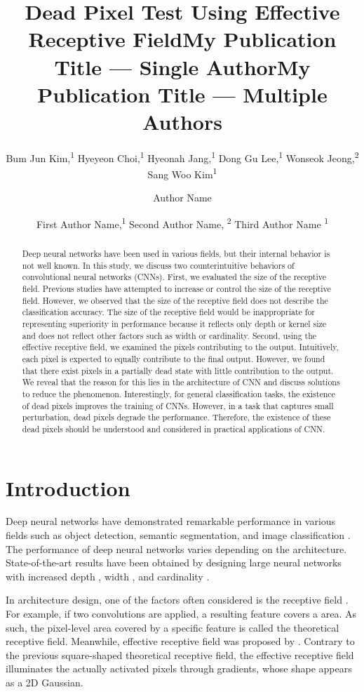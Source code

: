 \documentclass[letterpaper]{article} \usepackage{aaai22}  \usepackage{times}  \usepackage{helvet}  \usepackage{courier}  \usepackage[hyphens]{url}  \usepackage{graphicx} \urlstyle{rm} \def\UrlFont{\rm}  \usepackage{natbib}  \usepackage{caption} \DeclareCaptionStyle{ruled}{labelfont=normalfont,labelsep=colon,strut=off} \frenchspacing  \setlength{\pdfpagewidth}{8.5in}  \setlength{\pdfpageheight}{11in}  \usepackage{algorithm}
\title{Dead Pixel Test Using Effective Receptive Field}
\author{
Bum Jun Kim,\textsuperscript{\rm 1}
    Hyeyeon Choi,\textsuperscript{\rm 1}
    Hyeonah Jang,\textsuperscript{\rm 1}
    Dong Gu Lee,\textsuperscript{\rm 1}
    Wonseok Jeong,\textsuperscript{\rm 2}
    Sang Woo Kim\textsuperscript{\rm 1}
}
\title{My Publication Title --- Single Author}
\author {
    Author Name
}
\title{My Publication Title --- Multiple Authors}
\author {
First Author Name,\textsuperscript{\rm 1}
    Second Author Name, \textsuperscript{\rm 2}
    Third Author Name \textsuperscript{\rm 1}
}
\begin{document}
\maketitle

\begin{abstract}
    Deep neural networks have been used in various fields, but their internal behavior is not well known. In this study, we discuss two counterintuitive behaviors of convolutional neural networks (CNNs). First, we evaluated the size of the receptive field. Previous studies have attempted to increase or control the size of the receptive field. However, we observed that the size of the receptive field does not describe the classification accuracy. The size of the receptive field would be inappropriate for representing superiority in performance because it reflects only depth or kernel size and does not reflect other factors such as width or cardinality. Second, using the effective receptive field, we examined the pixels contributing to the output. Intuitively, each pixel is expected to equally contribute to the final output. However, we found that there exist pixels in a partially dead state with little contribution to the output. We reveal that the reason for this lies in the architecture of CNN and discuss solutions to reduce the phenomenon. Interestingly, for general classification tasks, the existence of dead pixels improves the training of CNNs. However, in a task that captures small perturbation, dead pixels degrade the performance. Therefore, the existence of these dead pixels should be understood and considered in practical applications of CNN.
\end{abstract}

\section{Introduction}
\label{sec:Introduction}

Deep neural networks have demonstrated remarkable performance in various fields such as object detection, semantic segmentation, and image classification \cite{ren2015faster,redmon2016you,long2015fully,ronneberger2015u,he2015delving,tan2019efficientnet}. The performance of deep neural networks varies depending on the architecture. State-of-the-art results have been obtained by designing large neural networks with increased depth \cite{he2016deep}, width \cite{zagoruyko2016wide}, and cardinality \cite{xie2017aggregated}.

In architecture design, one of the factors often considered is the receptive field \cite{araujo2019computing}. For example, if two  convolutions are applied, a resulting feature covers a  area. As such, the pixel-level area covered by a specific feature is called the theoretical receptive field. Meanwhile, effective receptive field was proposed by \citet{luo2016understanding}. Contrary to the previous square-shaped theoretical receptive field, the effective receptive field illuminates the actually activated pixels through gradients, whose shape appears as a 2D Gaussian.
\end{document}
